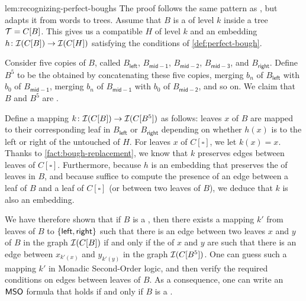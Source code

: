 \begin{proofof}{lem:recognizing-perfect-boughs}
  The proof follows the same pattern as 
  \cite[Lemma 19]{LOPEZ24}, but adapts it from words to trees. 
  Assume that $B$ is a  of level $k$ inside a tree
  $\t = C[B]$.
  This gives us a compatible  $H$ of level $k$
  and an embedding $h \colon \mathcal{I}(C[B]) \to \mathcal{I}(C[H])$
  satisfying the conditions of \cref{def:perfect-bough}.

  Consider five copies of $B$, called $B_\mathsf{left}$,
  $B_\mathsf{mid-1}$, $B_\mathsf{mid-2}$, $B_\mathsf{mid-3}$, and
  $B_\mathsf{right}$. Define $B^5$ to be the  obtained by
  concatenating these five copies, merging $b_n$ of $B_\mathsf{left}$ with $b_0$
  of $B_\mathsf{mid-1}$, merging $b_n$ of $B_\mathsf{mid-1}$ with $b_0$ of
  $B_\mathsf{mid-2}$, and so on. We claim that $B$ and $B^5$ are . 

  Define a mapping $k \colon \mathcal{I}(C[B]) \to
  \mathcal{I}(C[B^5])$
  as follows: leaves $x$ of $B$ are mapped to their
  corresponding leaf in $B_\mathsf{left}$ or $B_\mathsf{right}$ depending on
  whether $h(x)$ is to the left or right of the untouched  of
  $H$. For leaves $x$ of $C[\square]$, we let $k(x) = x$. 
  Thanks to \cref{fact:bough-replacement}, we know that
  $k$ preserves edges between leaves of $C[\square]$.
  Furthermore, because $h$ is an embedding that preserves the 
   of leaves in $B$, and because  suffice
  to compute the presence of an edge between a leaf of $B$ and a leaf of
  $C[\square]$ (or between two leaves of $B$), we deduce that $k$ is also an
  embedding.

  We have therefore shown that if $B$ is a , then there exists
  a mapping $k'$ from leaves of $B$ to $\{  \mathsf{left}, \mathsf{right}  \}$
  such that there is an edge between two leaves $x$ and $y$ of $B$ in the graph
  $\mathcal{I}(C[B])$ if and only if the  of $x$ and $y$ are
  such that there is an edge between $x_{k'(x)}$ and $y_{k'(y)}$ in the graph
  $\mathcal{I}(C[B^5])$. One can guess such a mapping $k'$ in Monadic Second-Order
  logic, and then verify the required conditions on edges between leaves of $B$.
  As a consequence, one can write an $\mathsf{MSO}$ formula that holds if and only if
  $B$ is a .
\end{proofof}

